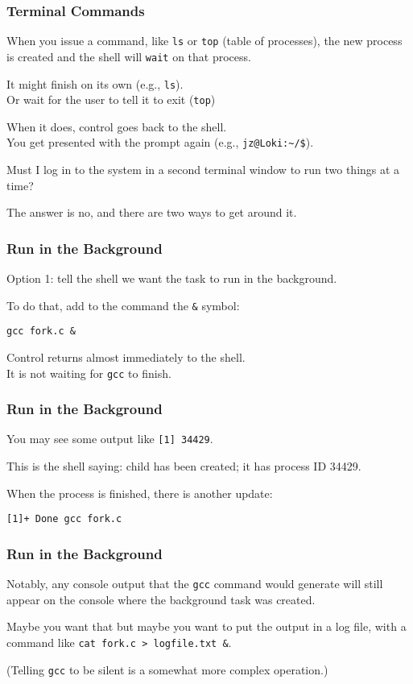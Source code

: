 \begin{frame}
	\frametitle{Terminal Commands}

	When you issue a command, like \texttt{ls} or \texttt{top} (table of processes), the new process is created and the shell will \texttt{wait} on that process.

	It might finish on its own (e.g., \texttt{ls}).\\
	\quad Or wait for the user to tell it to exit (\texttt{top})

	When it does, control goes back to the shell.\\
	\quad You get presented with the prompt again (e.g., \texttt{jz@Loki:\~{}/\$}).

	Must I log in to the system in a second terminal window to run two things at a time?

	The answer is no, and there are two ways to get around it.

\end{frame}

\begin{frame}
	\frametitle{Run in the Background}

	Option 1: tell the shell we want the task to run in the background.

	To do that, add to the command the \texttt{\&} symbol:

	\texttt{gcc fork.c \&}

	Control returns almost immediately to the shell.\\
	\quad It is not waiting for \texttt{gcc} to finish.

\end{frame}

\begin{frame}
	\frametitle{Run in the Background}

	You may see some output like \texttt{[1] 34429}.

	This is the shell saying: child has been created; it has process ID 34429.

	When the process is finished, there is another update:

	\texttt{[1]+  Done                    gcc fork.c}

\end{frame}

\begin{frame}
	\frametitle{Run in the Background}

	Notably, any console output that the \texttt{gcc} command would generate will still appear on the console where the background task was created.

	Maybe you want that but maybe you want to put the output in a log file, with a command like \texttt{cat fork.c > logfile.txt \&}.

	(Telling \texttt{gcc} to be silent is a somewhat more complex operation.)

\end{frame}

